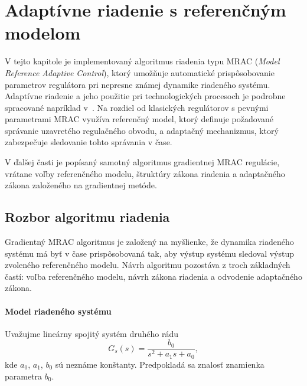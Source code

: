 
\section{Adaptívne riadenie s referenčným modelom}
\label{sec:mrac_gradient}

V tejto kapitole je implementovaný algoritmus riadenia typu
MRAC (\textit{Model Reference Adaptive Control}),
ktorý umožňuje automatické prispôsobovanie parametrov regulátora
pri nepresne známej dynamike riadeného systému.
Adaptívne riadenie a jeho použitie pri technologických procesoch je
podrobne spracované napríklad v~\cite{murgas1993,tao2003}.
Na rozdiel od klasických regulátorov s pevnými parametrami
MRAC využíva referenčný model,
ktorý definuje požadované správanie uzavretého regulačného obvodu,
a adaptačný mechanizmus,
ktorý zabezpečuje sledovanie tohto správania v čase.

V ďalšej časti je popísaný samotný algoritmus gradientnej MRAC regulácie,
vrátane voľby referenčného modelu,
štruktúry zákona riadenia
a adaptačného zákona založeného na gradientnej metóde.

\subsection{Rozbor algoritmu riadenia}
\label{sec:mrac_gradient_algorithm}

Gradientný MRAC algoritmus je založený na myšlienke,
že dynamika riadeného systému má byť v čase prispôsobovaná tak,
aby výstup systému sledoval výstup zvoleného referenčného modelu.
Návrh algoritmu pozostáva z troch základných častí:
voľba referenčného modelu,
návrh zákona riadenia
a odvodenie adaptačného zákona.

\paragraph{Model riadeného systému}

Uvažujme lineárny spojitý systém druhého rádu
\begin{equation}
	G_s(s) = \frac{b_0}{s^2 + a_1 s + a_0},
	\label{eq:mrac_plant}
\end{equation}
kde $a_0$, $a_1$, $b_0$ sú neznáme konštanty.
Predpokladá sa znalosť znamienka parametra $b_0$.

